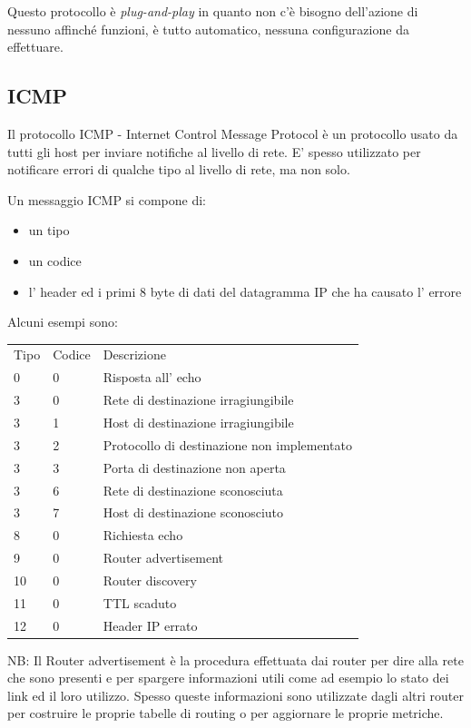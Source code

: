 Questo protocollo è \emph{plug-and-play} in quanto non c'è bisogno dell'azione di nessuno affinché funzioni, è tutto automatico, nessuna configurazione da effettuare.

\subsection{ICMP}
Il protocollo ICMP - Internet Control Message Protocol è un protocollo usato da tutti gli host per inviare notifiche al livello di rete.
E' spesso utilizzato per notificare errori di qualche tipo al livello di rete, ma non solo.

Un messaggio ICMP si compone di:
\begin{itemize}
    \item un tipo
    \item un codice
    \item l' header ed i primi 8 byte di dati del datagramma IP che ha causato l' errore
\end{itemize}
Alcuni esempi sono:
\begin{table}[ht!]
    \centering
    \begin{tabular}{l|l|l}
        Tipo & Codice & Descrizione \\
        0 & 0 & Risposta all' echo \\
        3 & 0 & Rete di destinazione irragiungibile \\
        3 & 1 & Host di destinazione irragiungibile \\
        3 & 2 & Protocollo di destinazione non implementato \\
        3 & 3 & Porta di destinazione non aperta \\
        3 & 6 & Rete di destinazione sconosciuta \\
        3 & 7 & Host di destinazione sconosciuto \\
        8 & 0 & Richiesta echo \\
        9 & 0 & Router advertisement \\
        10 & 0 & Router discovery \\
        11 & 0 & TTL scaduto \\
        12 & 0 & Header IP errato \\
    \end{tabular}
\end{table}

NB: Il Router advertisement è la procedura effettuata dai router per dire alla rete che sono presenti e per spargere informazioni utili come ad esempio lo stato dei link ed il loro utilizzo.
Spesso queste informazioni sono utilizzate dagli altri router per costruire le proprie tabelle di routing o per aggiornare le proprie metriche.

